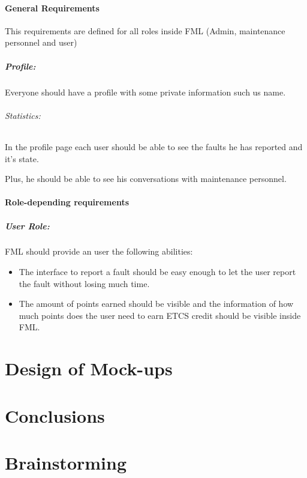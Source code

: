 \documentclass{report}
\begin{document}
\subsubsection{General Requirements}

This requirements are defined for all roles inside FML (Admin, maintenance personnel and user)

\paragraph{Profile: } Everyone should have a profile with some private information such us name.
\subparagraph{Statistics: } In the profile page each user should be able to see the faults he has reported and it's state. 

Plus, he should be able to see his conversations with maintenance personnel.


\subsubsection{Role-depending requirements}

\paragraph{User Role: }
FML should provide an user the following abilities:
\begin{itemize}
\item The interface to report a fault should be easy enough to let the user report the fault without losing much time.
\item The amount of points earned should be visible and the information of how much points does the user need to earn ETCS credit should be visible inside FML.
\end{itemize}


\chapter{Design of Mock-ups}

\chapter{Conclusions}


\appendix

\chapter{Brainstorming}
\end{document}
